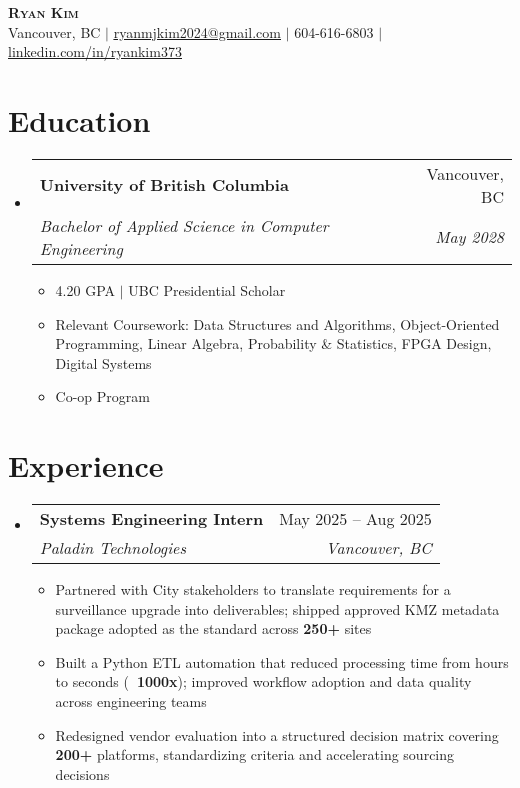 \documentclass[letterpaper,11pt]{article} %
\makeatletter
\newcommand{\resumeItem}[1]{\item\small{{#1 \vspace{-2pt}}}}
\newcommand{\resumeSubheading}[4]{
  \vspace{-2pt}\item
    \begin{tabular*}{0.97\textwidth}[t]{l@{\extracolsep{\fill}}r}
      \textbf{#1} & #2 \\
      \textit{\small#3} & \textit{\small #4} \\
    \end{tabular*}\vspace{-6pt}
}
\newcommand{\resumeSubHeadingListStart}{\begin{itemize}[leftmargin=0.15in, label={}]}
\newcommand{\resumeSubHeadingListEnd}{\end{itemize}}
\newcommand{\resumeItemListStart}{\begin{itemize}[leftmargin=0.15in]}
\newcommand{\resumeItemListEnd}{\end{itemize}\vspace{-5.5pt}}
\makeatother
\begin{document}
\begin{center}
    \textbf{\LARGE \scshape Ryan Kim} \\ \vspace{3pt}
    \small Vancouver, BC $|$ \href{mailto:ryanmjkim2024@gmail.com}{\underline{ryanmjkim2024@gmail.com}} $|$ 604-616-6803 $|$ \href{https://linkedin.com/in/ryankim373}{\underline{linkedin.com/in/ryankim373}}
\end{center}

\section{Education}
  \resumeSubHeadingListStart
    \resumeSubheading
      {University of British Columbia}{Vancouver, BC}
      {Bachelor of Applied Science in Computer Engineering}{May 2028}
      \resumeItemListStart
        \resumeItem{4.20 GPA $|$ UBC Presidential Scholar}
        \resumeItem{Relevant Coursework: Data Structures and Algorithms, Object-Oriented Programming, Linear Algebra, Probability \& Statistics, FPGA Design, Digital Systems}
        \resumeItem{Co-op Program}
      \resumeItemListEnd
  \resumeSubHeadingListEnd

\section{Experience}
  \resumeSubHeadingListStart
    \resumeSubheading
      {Systems Engineering Intern}{May 2025 -- Aug 2025}
      {Paladin Technologies}{Vancouver, BC}
      \resumeItemListStart
        \resumeItem{Partnered with City stakeholders to translate requirements for a surveillance upgrade into deliverables; shipped approved KMZ metadata package adopted as the standard across \textbf{250+} sites}
        \resumeItem{Built a Python ETL automation that reduced processing time from hours to seconds (\textbf{~1000x}); improved workflow adoption and data quality across engineering teams}
        \resumeItem{Redesigned vendor evaluation into a structured decision matrix covering \textbf{200+} platforms, standardizing criteria and accelerating sourcing decisions}
      \resumeItemListEnd
  \resumeSubHeadingListEnd

\end{document}
